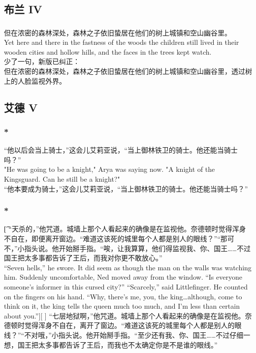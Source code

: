 \documentclass[12pt,a4paper]{article}
\newcommand{\h}[1]{{\color{red}#1}\\}
\newcommand{\la}[1]{{\color{blue}#1}\\}
\begin{document}
		
\subsection{布兰 IV}
\subsubsection{}\la{
但在浓密的森林深处，森林之子依旧蛰居在他们的树上城镇和空山幽谷里。\\
Yet here and there in the fastness of the woods the children still lived in their wooden cities and hollow hills, and the faces in the trees kept watch. }\h{
少了一句，新版已纠正：}
但在浓密的森林深处，森林之子依旧蛰居在他们的树上城镇和空山幽谷里，透过树上的人脸监视外界。

\subsection{艾德 V}
\subsubsection{\color{red}*}\la{
	“他以后会当上骑士，”这会儿艾莉亚说，“当上御林铁卫的骑士。他还能当骑士吗？”\\
	"He was going to be a knight," Arya was saying now. "A knight of the Kingsguard. Can he still be a knight?"}
	“他本要成为骑士，”这会儿艾莉亚说，“当上御林铁卫的骑士。他还能当骑士吗？”

\subsubsection{\color{red}*}\t[
	“天杀的，”他咒道。城墙上那个人看起来的确像是在监视他。奈德顿时觉得浑身不自在，即便离开窗边。“难道这该死的城里每个人都是别人的眼线？”“那可不，”小指头说。他开始掰手指。“唉，让我算算，他们得监视我、你、国王……不过国王把太多事都告诉了王后，而我对你更不敢放心。”\\
	“Seven hells,” he swore. It did seem as though the man on the walls was watching him. Suddenly uncomfortable, Ned moved away from the window. “Is everyone someone's informer in this cursed city?”
	“Scarcely,” said Littlefinger. He counted on the fingers on his hand. “Why, there's me, you, the king\ldots although, come to think on it, the king tells the queen much too much, and I'm less than certain about you.”][
	]
	“七层地狱啊，”他咒道。城墙上那个人看起来的确像是在监视他。奈德顿时觉得浑身不自在，离开了窗边。“难道这该死的城里每个人都是别人的眼线？”“不对哦，”小指头说。他开始掰手指。“至少还有我、你、国王……不过仔细一想，国王把太多事都告诉了王后，而我也不太确定你是不是谁的眼线。”
		
\end{document}

